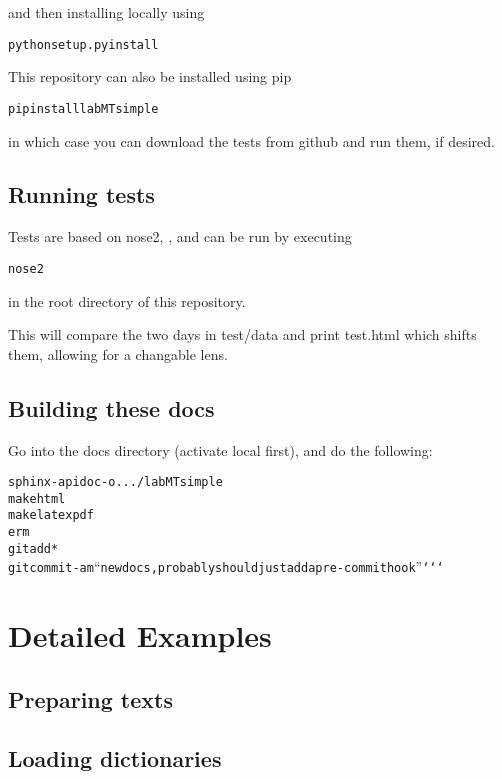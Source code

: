 \documentclass[letterpaper,10pt,english]{sphinxmanual}
\begin{document}
and then installing locally using
\begin{alltt}
python setup.py install
\end{alltt}

This repository can also be installed using pip
\begin{alltt}
pip install labMTsimple
\end{alltt}

in which case you can download the tests from github and run them, if desired.


\section{Running tests}
\label{getting-started:running-tests}
Tests are based on nose2, , and can be run by executing
\begin{alltt}
nose2
\end{alltt}

in the root directory of this repository.

This will compare the two days in test/data and print test.html which shifts them, allowing for a changable lens.


\section{Building these docs}
\label{getting-started:building-these-docs}
Go into the docs directory (activate local  first), and do the following:
\begin{alltt}
sphinx-apidoc -o . ../labMTsimple
make html
make latexpdf
erm
git add *
git commit -am ``new docs, probably should just add a pre-commit hook''{}`{}`{}`
\end{alltt}


\chapter{Detailed Examples}
\label{detailed-example::doc}\label{detailed-example:detailed-examples}

\section{Preparing texts}
\label{detailed-example:preparing-texts}

\section{Loading dictionaries}
\label{detailed-example:loading-dictionaries}
\end{document}
